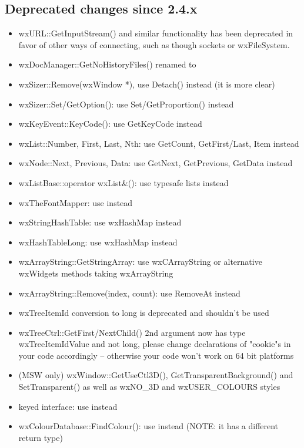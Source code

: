 \subsection{Deprecated changes since 2.4.x}\label{deprecatedsince24}

\begin{itemize}\itemsep=0pt
\item wxURL::GetInputStream() and similar functionality has been deprecated in favor of other ways of connecting, such as though sockets or wxFileSystem.
\item wxDocManager::GetNoHistoryFiles() renamed to 
\item wxSizer::Remove(wxWindow *), use Detach() instead (it is more clear)
\item wxSizer::Set/GetOption(): use Set/GetProportion() instead
\item wxKeyEvent::KeyCode(): use GetKeyCode instead
\item wxList::Number, First, Last, Nth: use GetCount, GetFirst/Last, Item instead
\item wxNode::Next, Previous, Data: use GetNext, GetPrevious, GetData instead
\item wxListBase::operator wxList\&(): use typesafe lists instead
\item wxTheFontMapper: use  instead
\item wxStringHashTable: use wxHashMap instead
\item wxHashTableLong: use wxHashMap instead
\item wxArrayString::GetStringArray: use wxCArrayString or alternative wxWidgets methods taking wxArrayString
\item wxArrayString::Remove(index, count): use RemoveAt instead
\item wxTreeItemId conversion to long is deprecated and shouldn't be used
\item wxTreeCtrl::GetFirst/NextChild() 2nd argument now has type wxTreeItemIdValue and not long, please change declarations of "cookie"s in your code accordingly -- otherwise your code won't work on 64 bit platforms
\item (MSW only) wxWindow::GetUseCtl3D(), GetTransparentBackground() and SetTransparent() as well as wxNO\_3D and wxUSER\_COLOURS styles
\item {} keyed interface: use  instead
\item wxColourDatabase::FindColour(): use  instead (NOTE: it has a different return type)

\end{itemize}
